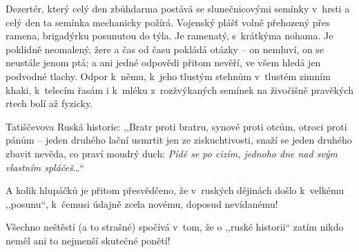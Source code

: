 Dezertér, který celý den zbůhdarma postává se slunečnicovými semínky v hrsti a celý den ta semínka mechanicky požírá. Vojenský plášť volně přehozený přes ramena, brigadýrku posunutou do týla. Je ramenatý, s krátkýma nohama. Je poklidně neomalený, žere a čas od času pokládá otázky -- on nemluví, on se neustále jenom ptá; a ani jedné odpovědi přitom nevěří, ve všem hledá jen podvodné tlachy. Odpor k němu, k jeho tlustým stehnům v tlustém zimním khaki, k telecím řasám i k mléku z rozžvýkaných semínek na živočišně pravěkých rtech bolí až fyzicky.

Tatiščevova Ruská historie:
,,Bratr proti bratru, synové proti otcům, otroci proti pánům -- jeden druhého lační usmrtit jen ze ziskuchtivosti, snaží se jeden druhého zbavit nevěda, co praví moudrý duch: \textit{Pídě se po cizím, jednoho dne nad svým vlastním spláčeš\ldots}``

A kolik hlupáčků je přitom přesvědčeno, že v ruských dějinách došlo k velkému ,,posunu``, k čemusi údajně zcela novému, doposud nevídanému!

Všechno neštěstí (a to strašné) spočívá v tom, že o ,,ruské historii`` zatím nikdo neměl ani to nejmenší skutečné ponětí!

